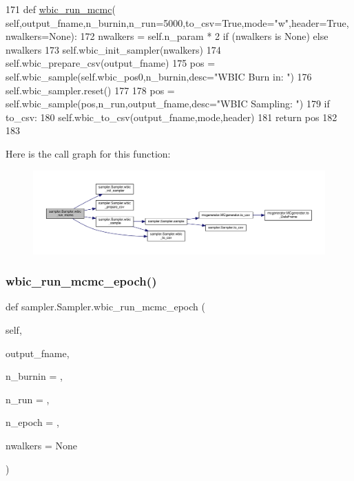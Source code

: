 \begin{DoxyCode}
171     \textcolor{keyword}{def }\hyperlink{classsampler_1_1Sampler_aa26f751fdfe25f8b8fcc450d09ace641}{wbic\_run\_mcmc}(
      self,output\_fname,n\_burnin,n\_run=5000,to\_csv=True,mode="w",header=True,nwalkers=None):
172         nwalkers = self.n\_param * 2 \textcolor{keywordflow}{if} (nwalkers \textcolor{keywordflow}{is} \textcolor{keywordtype}{None}) \textcolor{keywordflow}{else} nwalkers 
173         self.wbic\_init\_sampler(nwalkers)
174         self.wbic\_prepare\_csv(output\_fname)
175         pos = self.wbic\_sample(self.wbic\_pos0,n\_burnin,desc=\textcolor{stringliteral}{"WBIC Burn in: "})
176         self.wbic\_sampler.reset()
177         
178         pos = self.wbic\_sample(pos,n\_run,output\_fname,desc=\textcolor{stringliteral}{"WBIC Sampling: "})
179         \textcolor{keywordflow}{if} to\_csv:
180             self.wbic\_to\_csv(output\_fname,mode,header)
181         \textcolor{keywordflow}{return} pos
182 
183     
\end{DoxyCode}
Here is the call graph for this function\+:\nopagebreak
\begin{figure}[H]
\begin{center}
\leavevmode
\includegraphics[width=350pt]{d3/d8a/classsampler_1_1Sampler_aa26f751fdfe25f8b8fcc450d09ace641_cgraph}
\end{center}
\end{figure}
\mbox{\label{classsampler_1_1Sampler_a5e76a78ad9e222e49f77a4d2e6c23c04}} 
\subsubsection{\texorpdfstring{wbic\+\_\+run\+\_\+mcmc\+\_\+epoch()}{wbic\_run\_mcmc\_epoch()}}
{\footnotesize\ttfamily def sampler.\+Sampler.\+wbic\+\_\+run\+\_\+mcmc\+\_\+epoch (\begin{DoxyParamCaption}\item[{}]{self,  }\item[{}]{output\+\_\+fname,  }\item[{}]{n\+\_\+burnin = {},  }\item[{}]{n\+\_\+run = {},  }\item[{}]{n\+\_\+epoch = {},  }\item[{}]{nwalkers = {\ttfamily None} }\end{DoxyParamCaption})}



